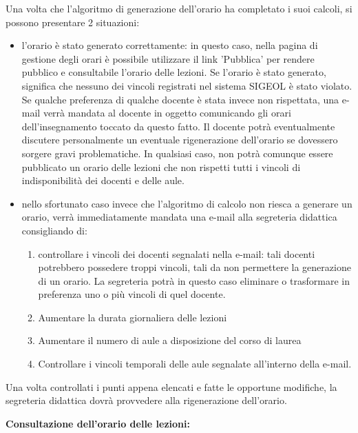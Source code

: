 \documentclass[11pt,a4paper]{article}
\begin{document}
Una volta che l'algoritmo di generazione dell'orario ha completato i suoi calcoli, si possono presentare 2 situazioni:
\begin{itemize}
 \item l'orario è stato generato correttamente: in questo caso, nella pagina di gestione degli orari è possibile utilizzare il link 'Pubblica' per rendere pubblico e consultabile l'orario delle lezioni. Se l'orario è stato generato, significa che nessuno dei vincoli registrati nel sistema SIGEOL è stato violato. Se qualche preferenza di qualche docente è stata invece non rispettata, una e-mail verrà mandata al docente in oggetto comunicando gli orari dell'insegnamento toccato da questo fatto. Il docente potrà eventualmente discutere personalmente un eventuale rigenerazione dell'orario se dovessero sorgere gravi problematiche. In qualsiasi caso, non potrà comunque essere pubblicato un orario delle lezioni che non rispetti tutti i vincoli di indisponibilità dei docenti e delle aule.
 \item nello sfortunato caso invece che l'algoritmo di calcolo non riesca a generare un orario, verrà immediatamente mandata una e-mail alla segreteria didattica consigliando di:
	\begin{enumerate}
	 \item controllare i vincoli dei docenti segnalati nella e-mail: tali docenti potrebbero possedere troppi vincoli, tali da non permettere la generazione di un orario. La segreteria potrà in questo caso eliminare o trasformare in preferenza uno o più vincoli di quel docente.
	 \item Aumentare la durata giornaliera delle lezioni
	 \item Aumentare il numero di aule a disposizione del corso di laurea
	 \item Controllare i vincoli temporali delle aule segnalate all'interno della e-mail.
	\end{enumerate}
\end{itemize}
Una volta controllati i punti appena elencati e fatte le opportune modifiche, la segreteria didattica dovrà provvedere alla rigenerazione dell'orario.
\newline \newline
\begin{large}\textbf{Consultazione dell'orario delle lezioni:}\end{large}
\end{document}
